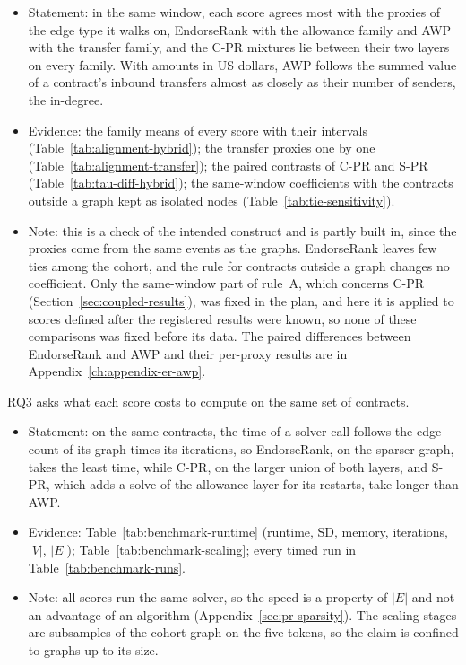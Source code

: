 \begin{itemize}
\item Statement: in the same window, each score agrees most with the proxies of the edge type it walks on, EndorseRank with the allowance family and AWP with the transfer family, and the C-PR mixtures lie between their two layers on every family. With amounts in US dollars, AWP follows the summed value of a contract's inbound transfers almost as closely as their number of senders, the in-degree.
\item Evidence: the family means of every score with their intervals (Table~\ref{tab:alignment-hybrid}); the transfer proxies one by one (Table~\ref{tab:alignment-transfer}); the paired contrasts of C-PR and S-PR (Table~\ref{tab:tau-diff-hybrid}); the same-window coefficients with the contracts outside a graph kept as isolated nodes (Table~\ref{tab:tie-sensitivity}).
\item Note: this is a check of the intended construct and is partly built in, since the proxies come from the same events as the graphs. EndorseRank leaves few ties among the cohort, and the rule for contracts outside a graph changes no coefficient. Only the same-window part of rule~A, which concerns C-PR (Section~\ref{sec:coupled-results}), was fixed in the plan, and here it is applied to scores defined after the registered results were known, so none of these comparisons was fixed before its data. The paired differences between EndorseRank and AWP and their per-proxy results are in Appendix~\ref{ch:appendix-er-awp}.
\end{itemize}


RQ3 asks what each score costs to compute on the same set of contracts.

\begin{itemize}
\item Statement: on the same contracts, the time of a solver call follows the edge count of its graph times its iterations, so EndorseRank, on the sparser graph, takes the least time, while C-PR, on the larger union of both layers, and S-PR, which adds a solve of the allowance layer for its restarts, take longer than AWP.
\item Evidence: Table~\ref{tab:benchmark-runtime} (runtime, SD, memory, iterations, $|V|$, $|E|$); Table~\ref{tab:benchmark-scaling}; every timed run in Table~\ref{tab:benchmark-runs}.
\item Note: all scores run the same solver, so the speed is a property of $|E|$ and not an advantage of an algorithm (Appendix~\ref{sec:pr-sparsity}). The scaling stages are subsamples of the cohort graph on the five tokens, so the claim is confined to graphs up to its size.
\end{itemize}

